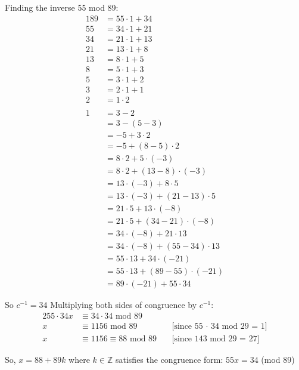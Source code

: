 \documentclass{article} %
\begin{document}
    Finding the inverse 55 mod 89:
    \begin{alignat*}{1}
        89 &= 55 \cdot 1 + 34\\
        55 &= 34 \cdot 1 + 21\\
        34 &= 21 \cdot 1 + 13\\
        21 &= 13 \cdot 1 + 8\\
        13 &= 8 \cdot 1 + 5\\
        8 &= 5 \cdot 1 + 3\\
        5 &= 3 \cdot 1 + 2\\
        3 &= 2 \cdot 1 + 1\\
        2 &= 1 \cdot 2\\
        \\
        1 &= 3 - 2\\
        &= 3 - (5 - 3)\\
        &= -5 + 3 \cdot 2\\
        &= -5 + (8 - 5) \cdot 2\\
        &= 8 \cdot 2 + 5 \cdot (-3)\\
        &= 8 \cdot 2 + (13 - 8) \cdot (-3)\\
        &= 13 \cdot (-3) + 8 \cdot 5\\
        &= 13 \cdot (-3) + (21 - 13) \cdot 5\\
        &= 21 \cdot 5 + 13 \cdot (-8)\\
        &= 21 \cdot 5 + (34 - 21) \cdot (-8)\\
        &= 34 \cdot (-8) + 21 \cdot 13\\
        &= 34 \cdot (-8) + (55 - 34) \cdot 13\\
        &= 55 \cdot 13 + 34 \cdot (-21)\\
        &= 55 \cdot 13 + (89 - 55) \cdot (-21)\\
        &= 89 \cdot (-21) + 55 \cdot 34
    \end{alignat*}

    So $c^{-1} = 34$
    Multiplying both sides of congruence by $c^{-1}$:
    \begin{alignat*}{2}
        55 \cdot 34x &\equiv 34 \cdot 34 \text{ mod } 89\ \\
        x &\equiv 1156 \text{ mod } 89 && \text{[since 55 $\cdot$ 34 mod 29 = 1]}\\
        x &\equiv 1156 \equiv 88 \text{ mod } 89\ && \text{[since 143 mod 29 = 27]}
    \end{alignat*}

    So, $x = 88 + 89k$ where $k \in \mathbb{Z}$ satisfies the congruence form: $55x = 34$ (mod 89)
\end{document}
